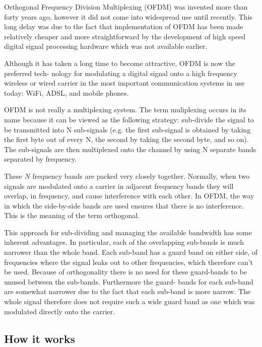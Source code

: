 Orthogonal Frequency Division Multiplexing (OFDM) \cite{LiStuber2006} was invented more than forty
years ago, however it did not come into widespread use until recently. This long delay was
due to the fact that implementation of OFDM has been made relatively cheaper and more
straightforward by the development of high speed digital signal processing hardware which
was not available earlier.

Although it has taken a long time to become attractive, OFDM is now the preferred tech-
nology for modulating a digital signal onto a high frequency wireless or wired carrier in the
most important communication systems in use today: WiFi, ADSL, and mobile phones.

OFDM is not really a multiplexing system. The term muliplexing occurs in its name because
it can be viewed as the following strategy: sub-divide the signal to be transmitted into N
sub-signals (e.g. the first sub-signal is obtained by taking the first byte out of every N, the
second by taking the second byte, and so on). The sub-signals are then multiplexed onto the
channel by using N separate bands separated by frequency.

These $N$ frequency bands are packed very closely together. Normally, when two signals are
modulated onto a carrier in adjacent frequency bands they will overlap, in frequency, and
cause interference with each other. In OFDM, the way in which the side-by-side bands are
used ensures that there is no interference. This is the meaning of the term orthogonal.

This approach for sub-dividing and managing the available bandwidth has some inherent
advantages. In particular, each of the overlapping sub-bands is much narrower than the whole
band. Each sub-band has a guard band on either side, of frequencies where the signal leaks
out to other frequencies, which therefore can’t be used. Because of orthogonality there is
no need for these guard-bands to be unused between the sub-bands. Furthermore the guard-
bands for each sub-band are somewhat narrower due to the fact that each sub-band is more
narrow. The whole signal therefore does not require such a wide guard band as one which
was modulated directly onto the carrier.

\subsection{How it works}


